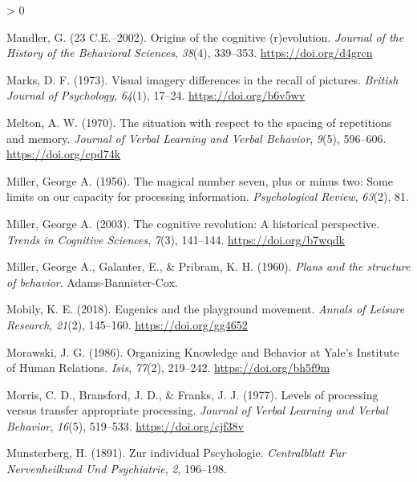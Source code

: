 \documentclass[
  oneside,
  12pt]{crumpbook}
\newlength{\cslhangindent}
\newenvironment{CSLReferences}[2] %
 {%
  \setlength{\parindent}{0pt}
  \ifodd #1 \everypar{\setlength{\hangindent}{\cslhangindent}}\ignorespaces\fi
  \ifnum #2 > 0
  \setlength{\parskip}{#2\baselineskip}
  \fi
 }%
 {}
\begin{document}
\begin{CSLReferences}{1}{0}
\leavevmode\hypertarget{ref-mandlerOriginsCognitiveEvolution23}{}%
Mandler, G. (23 C.E.--2002). Origins of the cognitive (r)evolution. \emph{Journal of the History of the Behavioral Sciences}, \emph{38}(4), 339--353. \url{https://doi.org/d4grcn}

\leavevmode\hypertarget{ref-marksVisualImageryDifferences1973}{}%
Marks, D. F. (1973). Visual imagery differences in the recall of pictures. \emph{British Journal of Psychology}, \emph{64}(1), 17--24. \url{https://doi.org/b6v5wv}

\leavevmode\hypertarget{ref-meltonSituationRespectSpacing1970}{}%
Melton, A. W. (1970). The situation with respect to the spacing of repetitions and memory. \emph{Journal of Verbal Learning and Verbal Behavior}, \emph{9}(5), 596--606. \url{https://doi.org/cpd74k}

\leavevmode\hypertarget{ref-millerMagicalNumberSeven1956}{}%
Miller, George A. (1956). The magical number seven, plus or minus two: {Some} limits on our capacity for processing information. \emph{Psychological Review}, \emph{63}(2), 81.

\leavevmode\hypertarget{ref-millerCognitiveRevolutionHistorical2003}{}%
Miller, George A. (2003). The cognitive revolution: A historical perspective. \emph{Trends in Cognitive Sciences}, \emph{7}(3), 141--144. \url{https://doi.org/b7wqdk}

\leavevmode\hypertarget{ref-millerPlansStructureBehavior1960}{}%
Miller, George A., Galanter, E., \& Pribram, K. H. (1960). \emph{Plans and the structure of behavior}. {Adams-Bannister-Cox}.

\leavevmode\hypertarget{ref-mobilyEugenicsPlaygroundMovement2018}{}%
Mobily, K. E. (2018). Eugenics and the playground movement. \emph{Annals of Leisure Research}, \emph{21}(2), 145--160. \url{https://doi.org/gg4652}

\leavevmode\hypertarget{ref-morawskiOrganizingKnowledgeBehavior1986}{}%
Morawski, J. G. (1986). Organizing {Knowledge} and {Behavior} at {Yale}'s {Institute} of {Human Relations}. \emph{Isis}, \emph{77}(2), 219--242. \url{https://doi.org/bh5f9m}

\leavevmode\hypertarget{ref-morrisLevelsProcessingTransfer1977}{}%
Morris, C. D., Bransford, J. D., \& Franks, J. J. (1977). Levels of processing versus transfer appropriate processing. \emph{Journal of Verbal Learning and Verbal Behavior}, \emph{16}(5), 519--533. \url{https://doi.org/cjf38v}

\leavevmode\hypertarget{ref-munsterbergZurIndividualPscyhologie1891}{}%
Munsterberg, H. (1891). Zur individual {Pscyhologie}. \emph{Centralblatt Fur Nervenheilkund Und Psychiatrie}, \emph{2}, 196--198.


\end{CSLReferences}
\end{document}
